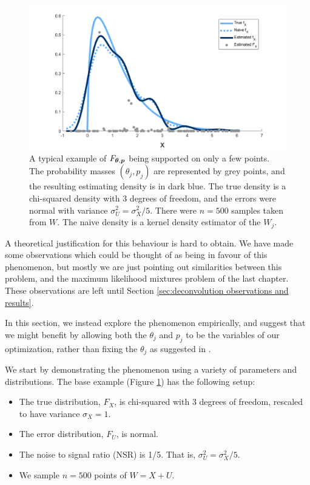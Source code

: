 	\begin{figure}
		\centering
		\includegraphics[width = \textwidth]{Figures/Deconvolution/fixed_masses_example.png}
		\caption[A typical example of $F_{\vect{\theta}, \vect{p}}$ being supported on only a few points]{A typical example of $F_{\vect{\theta}, \vect{p}}$ being supported on only a few points. The probability masses $(\theta_j, p_j)$ are represented by grey points, and the resulting estimating density is in dark blue. The true density is a chi-squared density with 3 degrees of freedom, and the errors were normal with variance $\sigma_U^2 = \sigma_X^2 / 5$. There were $n = 500$ samples taken from $W$. The naive density is a kernel density estimator of the $W_j$.}
		\label{fig:fixed masses example alone}
	\end{figure}

	A theoretical justification for this behaviour is hard to obtain. We have made some observations which could be thought of as being in favour of this phenomenon, but mostly we are just pointing out similarities between this problem, and the maximum likelihood mixtures problem of the last chapter. These observations are left until Section \ref{sec:deconvolution observations and results}.

	In this section, we instead explore the phenomenon empirically, and suggest that we might benefit by allowing both the $\theta_j$ and $p_j$ to be the variables of our optimization, rather than fixing the $\theta_j$ as suggested in \cite{Delaigle2016-la}.

	We start by demonstrating the phenomenon using a variety of parameters and distributions. The base example (Figure \ref{fig:fixed masses example alone}) has the following setup:

	\begin{itemize}
		\item The true distribution, $F_X$, is chi-squared with 3 degrees of freedom, rescaled to have variance $\sigma_X = 1$.
		\item The error distribution, $F_U$, is normal.
		\item The noise to signal ratio (NSR) is 1/5. That is, $\sigma_U^2 = \sigma_X^2 / 5$.
		\item We sample $n = 500$ points of $W = X+U$.
	\end{itemize}

